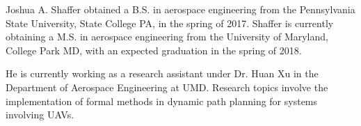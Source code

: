 \documentclass{ieeeaccess}
\begin{document}




%

\begin{IEEEbiography}{Joshua A. Shaffer} 
 obtained a B.S. in aerospace engineering from the Pennsylvania State University, State College PA, in the spring of 2017. Shaffer is currently obtaining a M.S. in aerospace engineering from the University of Maryland, College Park MD, with an expected graduation in the spring of 2018.

He is currently working as a research assistant under Dr. Huan Xu in the Department of Aerospace Engineering at UMD. Research topics involve the implementation of formal methods in dynamic path planning for systems involving UAVs.
\end{IEEEbiography}
\end{document}
